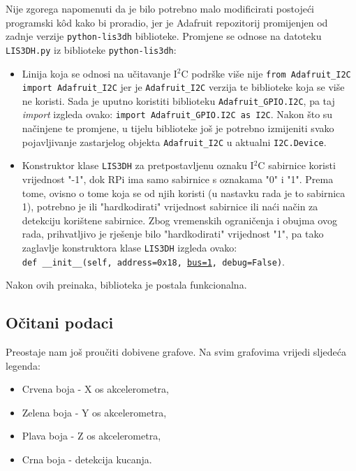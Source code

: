 \documentclass[12pt,a4paper]{article}
\begin{document}
		



	Nije zgorega napomenuti da je bilo potrebno malo modificirati postojeći programski kôd kako bi proradio, jer je Adafruit repozitorij promijenjen od zadnje verzije \texttt{python-lis3dh} biblioteke. Promjene se odnose na datoteku \texttt{LIS3DH.py} iz biblioteke \texttt{python-lis3dh}:
		\begin{itemize}
			\item Linija koja se odnosi na učitavanje I$^2$C podrške više nije 
			\texttt{from Adafruit\_I2C import Adafruit\_I2C} jer je \texttt{Adafruit\_I2C} verzija te biblioteke koja se više ne koristi. Sada je uputno koristiti biblioteku \texttt{Adafruit\_GPIO.I2C}, pa taj \textit{import} izgleda ovako:
			\texttt{import Adafruit\_GPIO.I2C as I2C}. 
			Nakon što su načinjene te promjene, u tijelu biblioteke još je potrebno izmijeniti svako pojavljivanje zastarjelog objekta \texttt{Adafruit\_I2C} u aktualni \texttt{I2C.Device}.
			\item Konstruktor klase \texttt{LIS3DH} za pretpostavljenu oznaku I$^2$C sabirnice koristi vrijednost "-1", dok RPi ima samo sabirnice s oznakama "0" i "1". Prema tome, ovisno o tome koja se od njih koristi (u nastavku rada je to sabirnica 1), potrebno je ili "hardkodirati" vrijednost sabirnice ili naći način za detekciju korištene sabirnice. Zbog vremenskih ograničenja i obujma ovog rada, prihvatljivo je rješenje bilo "hardkodirati" vrijednost "1", pa tako zaglavlje konstruktora klase \texttt{LIS3DH} izgleda ovako: \\ 
			\texttt{def \_\_init\_\_(self, address=0x18, \underline{bus=1}, debug=False)}.
		\end{itemize}
		Nakon ovih preinaka, biblioteka je postala funkcionalna.

	\newpage
	\subsection{Očitani podaci}
	Preostaje nam još proučiti dobivene grafove. Na svim grafovima vrijedi sljedeća legenda:
	\begin{itemize}
		\item Crvena boja - X os akcelerometra,
		\item Zelena boja - Y os akcelerometra,
		\item Plava boja - Z os akcelerometra,
		\item Crna boja - detekcija kucanja.
	\end{itemize}
\end{document}
